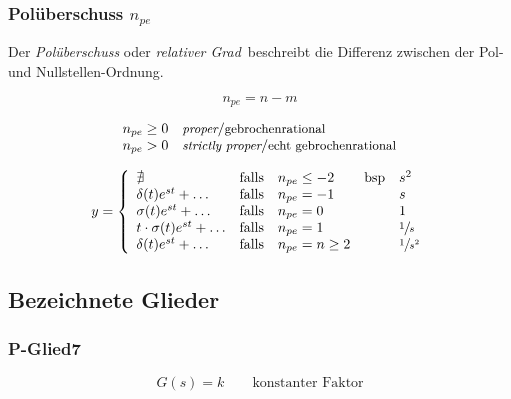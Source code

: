 \documentclass[
  10pt,
  a4paper,
  twocolumn]{article}
\numberwithin{equation}{section}
\begin{document}
\hypertarget{poluxfcberschuss-n_pe}{%
\subsubsection{\texorpdfstring{Polüberschuss
\(n_{pe}\)}{Polüberschuss n\_\{pe\}}}\label{poluxfcberschuss-n_pe}}

Der \emph{Polüberschuss} oder \emph{relativer Grad}~beschreibt die
Differenz zwischen der Pol- und Nullstellen-Ordnung.

\[
n_{pe} = n - m
\]

\[
\begin{array}{ll}
n_{pe} \geq 0 & \small{\textit{proper}/\text{gebrochenrational}} \\
n_{pe}  >   0 & \small{\textit{strictly proper}/\text{echt gebrochenrational}} \\
\end{array}
\]

\[
y=\left\{
\begin{array}{lclcl}
\nexists & \text{falls} & n_{pe} \leq -2 & \text{bsp} & s^2 \\
\delta(t)e^{st}+\ldots & \text{falls} & n_{pe} = -1 &  & s \\
\sigma(t)e^{st}+\ldots & \text{falls} & n_{pe} = 0 &  & 1 \\
t\cdot\sigma(t)e^{st}+\ldots & \text{falls} & n_{pe} = 1 &  & \sfrac{1}{s} \\
\delta(t)e^{st}+\ldots & \text{falls} & n_{pe} = n \geq 2 &  &  \sfrac{1}{s^2}
\end{array}
\right.
\]

\hypertarget{bezeichnete-glieder}{%
\subsection{Bezeichnete Glieder}\label{bezeichnete-glieder}}

\hypertarget{p-glied7}{%
\subsubsection{P-Glied7}\label{p-glied7}}

\[
G(s)=k\qquad \text{konstanter Faktor}
\]
\end{document}
